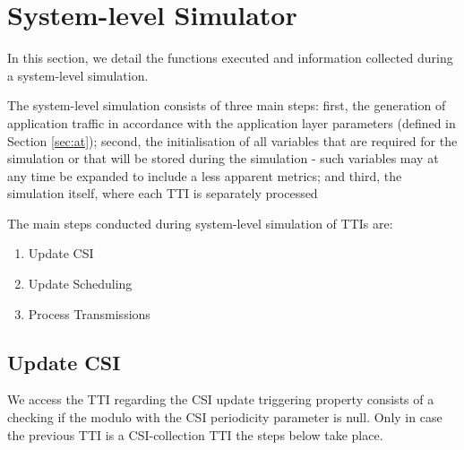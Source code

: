 \section{System-level Simulator}
\label{sec:sls}

In this section, we detail the functions executed and information collected during a system-level simulation.

The system-level simulation consists of three main steps: first, the generation of application traffic in accordance with the application layer parameters (defined in Section \ref{sec:at}); second, the initialisation of all variables that are required for the simulation or that will be stored during the simulation - such variables may at any time be expanded to include a less  apparent metrics; and third, the simulation itself, where each \ac{TTI} is separately processed


The main steps conducted during system-level simulation of TTIs are:

\begin{enumerate}
    \item Update \ac{CSI}
    \item Update Scheduling 
    \item Process Transmissions
\end{enumerate}


\subsection{Update CSI}
We access the TTI regarding the CSI update triggering property consists of a checking if the modulo with the CSI periodicity parameter is null. Only in case the previous \ac{TTI} is a \ac{CSI}-collection \ac{TTI} the steps below take place.


